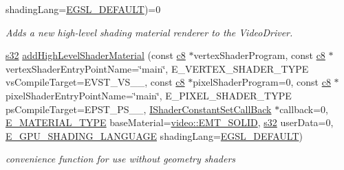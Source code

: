 \begin{DoxyCompactItemize}
shading\+Lang=\hyperlink{namespaceirr_1_1video_a913671e32f20f13e51336bfbe20a82a3a3eebb0c52e3bcfee28013cfb518b4ea9}{E\+G\+S\+L\+\_\+\+D\+E\+F\+A\+U\+LT})=0
\begin{DoxyCompactList}\small\item\em Adds a new high-\/level shading material renderer to the Video\+Driver. \end{DoxyCompactList}\item 
\mbox{\label{classirr_1_1video_1_1IGPUProgrammingServices_aa65337bb19777dd025ff02f1953277b6}} 
\hyperlink{namespaceirr_ac66849b7a6ed16e30ebede579f9b47c6}{s32} \hyperlink{classirr_1_1video_1_1IGPUProgrammingServices_aa65337bb19777dd025ff02f1953277b6}{add\+High\+Level\+Shader\+Material} (const \hyperlink{namespaceirr_a9395eaea339bcb546b319e9c96bf7410}{c8} $\ast$vertex\+Shader\+Program, const \hyperlink{namespaceirr_a9395eaea339bcb546b319e9c96bf7410}{c8} $\ast$vertex\+Shader\+Entry\+Point\+Name=\char`\"{}main\char`\"{}, E\+\_\+\+V\+E\+R\+T\+E\+X\+\_\+\+S\+H\+A\+D\+E\+R\+\_\+\+T\+Y\+PE vs\+Compile\+Target=E\+V\+S\+T\+\_\+\+V\+S\+\_\+\_, const \hyperlink{namespaceirr_a9395eaea339bcb546b319e9c96bf7410}{c8} $\ast$pixel\+Shader\+Program=0, const \hyperlink{namespaceirr_a9395eaea339bcb546b319e9c96bf7410}{c8} $\ast$pixel\+Shader\+Entry\+Point\+Name=\char`\"{}main\char`\"{}, E\+\_\+\+P\+I\+X\+E\+L\+\_\+\+S\+H\+A\+D\+E\+R\+\_\+\+T\+Y\+PE ps\+Compile\+Target=E\+P\+S\+T\+\_\+\+P\+S\+\_\+\_, \hyperlink{classirr_1_1video_1_1IShaderConstantSetCallBack}{I\+Shader\+Constant\+Set\+Call\+Back} $\ast$callback=0, \hyperlink{namespaceirr_1_1video_ac8e9b6c66f7cebabd1a6d30cbc5430f1}{E\+\_\+\+M\+A\+T\+E\+R\+I\+A\+L\+\_\+\+T\+Y\+PE} base\+Material=\hyperlink{namespaceirr_1_1video_ac8e9b6c66f7cebabd1a6d30cbc5430f1aa0b13db05ac3b5f40e692769de202660}{video\+::\+E\+M\+T\+\_\+\+S\+O\+L\+ID}, \hyperlink{namespaceirr_ac66849b7a6ed16e30ebede579f9b47c6}{s32} user\+Data=0, \hyperlink{namespaceirr_1_1video_a913671e32f20f13e51336bfbe20a82a3}{E\+\_\+\+G\+P\+U\+\_\+\+S\+H\+A\+D\+I\+N\+G\+\_\+\+L\+A\+N\+G\+U\+A\+GE} shading\+Lang=\hyperlink{namespaceirr_1_1video_a913671e32f20f13e51336bfbe20a82a3a3eebb0c52e3bcfee28013cfb518b4ea9}{E\+G\+S\+L\+\_\+\+D\+E\+F\+A\+U\+LT})
\begin{DoxyCompactList}\small\item\em convenience function for use without geometry shaders \end{DoxyCompactList}\item 

\end{DoxyCompactItemize}
